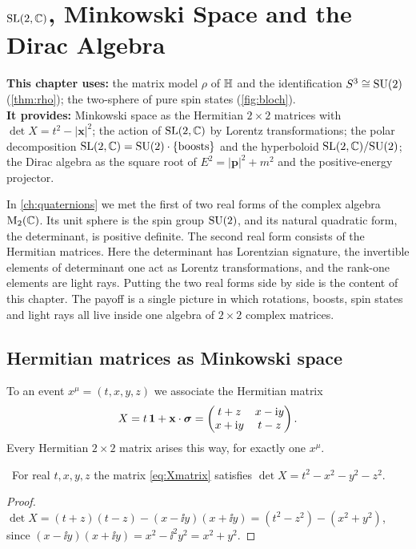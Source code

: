 \chapter{\texorpdfstring{$\mathrm{SL}(2,\mathbb{C})$}{SL(2,C)}, Minkowski Space and the Dirac Algebra}
\label{ch:lorentz}

\begin{usesbox}
\textbf{This chapter uses:} the matrix model $\rho$ of $\mathbb{H}$ and the identification $S^3\cong\mathrm{SU}(2)$ (\cref{thm:rho}); the two-sphere of pure spin states (\cref{fig:bloch}).\\
\textbf{It provides:} Minkowski space as the Hermitian $2\times2$ matrices with $\det X=t^2-|\mathbf x|^2$; the action of $\mathrm{SL}(2,\mathbb{C})$ by Lorentz transformations; the polar decomposition $\mathrm{SL}(2,\mathbb{C})=\mathrm{SU}(2)\cdot\{\text{boosts}\}$ and the hyperboloid $\mathrm{SL}(2,\mathbb{C})/\mathrm{SU}(2)$; the Dirac algebra as the square root of $E^2=|\mathbf p|^2+m^2$ and the positive-energy projector.
\end{usesbox}

In \cref{ch:quaternions} we met the first of two real forms of the complex algebra $\mathrm{M}_2(\mathbb{C})$. Its unit sphere is the spin group $\mathrm{SU}(2)$, and its natural quadratic form, the determinant, is positive definite. The second real form consists of the Hermitian matrices. Here the determinant has Lorentzian signature, the invertible elements of determinant one act as Lorentz transformations, and the rank-one elements are light rays. Putting the two real forms side by side is the content of this chapter. The payoff is a single picture in which rotations, boosts, spin states and light rays all live inside one algebra of $2\times2$ complex matrices.

\section{Hermitian matrices as Minkowski space}

To an event $x^\mu=(t,x,y,z)$ we associate the Hermitian matrix
\begin{equation}\label{eq:Xmatrix}
X=t\,\mathbf 1+\mathbf x\cdot\boldsymbol{\sigma}=\begin{pmatrix} t+z & x-\mathrm{i} y\\ x+\mathrm{i} y & t-z\end{pmatrix}.
\end{equation}
Every Hermitian $2\times2$ matrix arises this way, for exactly one $x^\mu$.

\begin{theorem}\label{thm:detlorentz}\ver\
For real $t,x,y,z$ the matrix \eqref{eq:Xmatrix} satisfies $\det X=t^2-x^2-y^2-z^2$.
\end{theorem}
\begin{proof}
$\det X=(t+z)(t-z)-(x-\ii y)(x+\ii y)=(t^2-z^2)-(x^2+y^2)$, since $(x-\ii y)(x+\ii y)=x^2-\ii^2y^2=x^2+y^2$.
\end{proof}


